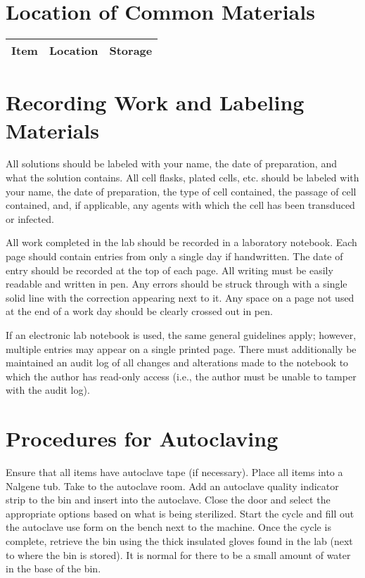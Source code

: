 
\section{Location of Common Materials}

\begin{tabular*}{\textwidth}{r | p{2in} p{2in}}
\hline
Item & Location & Storage \\
\hline
\end{tabular*}

\section{Recording Work and Labeling Materials}

All solutions should be labeled with your name, the date of preparation, and what the solution contains. All cell flasks, plated cells, etc. should be labeled with your name, the date of preparation, the type of cell contained, the passage of cell contained, and, if applicable, any agents with which the cell has been transduced or infected.

All work completed in the lab should be recorded in a laboratory notebook. Each page should contain entries from only a single day if handwritten. The date of entry should be recorded at the top of each page. All writing must be easily readable and written in pen. Any errors should be struck through with a single solid line with the correction appearing next to it. Any space on a page not used at the end of a work day should be clearly crossed out in pen.

If an electronic lab notebook is used, the same general guidelines apply; however, multiple entries may appear on a single printed page. There must additionally be maintained an audit log of all changes and alterations made to the notebook to which the author has read-only access (i.e., the author must be unable to tamper with the audit log).

\section{Procedures for Autoclaving}

Ensure that all items have autoclave tape (if necessary). Place all items into a Nalgene tub. Take to the autoclave room. Add an autoclave quality indicator strip to the bin and insert into the autoclave. Close the door and select the appropriate options based on what is being sterilized. Start the cycle and fill out the autoclave use form on the bench next to the machine. Once the cycle is complete, retrieve the bin using the thick insulated gloves found in the lab (next to where the bin is stored). It is normal for there to be a small amount of water in the base of the bin.

